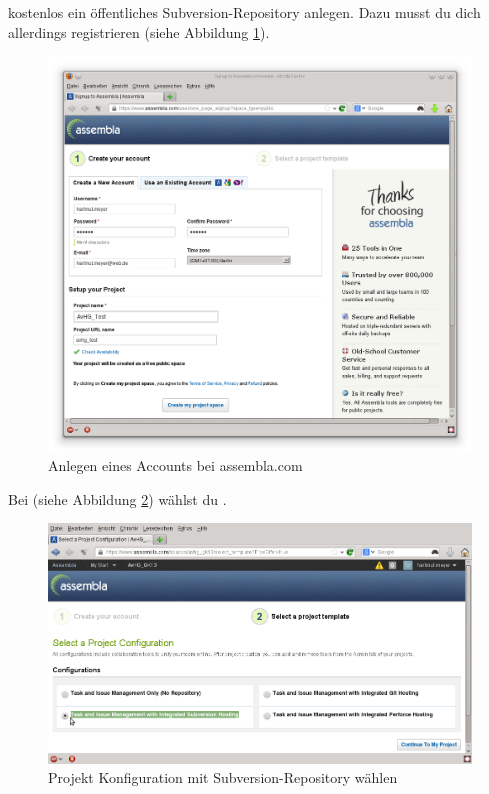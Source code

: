 kostenlos ein öffentliches Subversion-Repository anlegen. Dazu musst du dich
allerdings registrieren (siehe Abbildung \ref{fig:assembla-account-creation}).

\begin{figure}[h]
  \centering
   \includegraphics[width=1.0\textwidth]{./inf/SEKII/01_Vorbereitung/Assembla_Account_Creation.png}
   \caption{Anlegen eines Accounts bei assembla.com}
   \label{fig:assembla-account-creation}
\end{figure}

Bei  (siehe Abbildung
\ref{fig:assembla-project-configuration}) wählst du .

\begin{figure}[h]
  \centering
   \includegraphics[width=1.0\textwidth]{./inf/SEKII/01_Vorbereitung/Assembla_Project_Configuration.png}
   \caption{Projekt Konfiguration mit Subversion-Repository wählen}
   \label{fig:assembla-project-configuration}
\end{figure}


